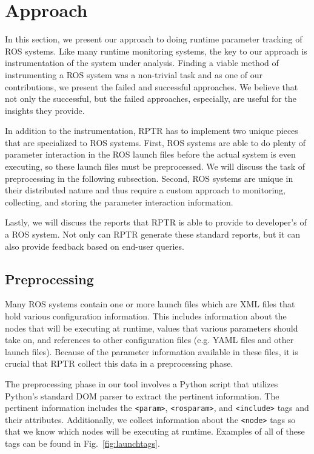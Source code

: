 \section{Approach}

In this section, we present our approach to doing runtime parameter tracking of ROS systems. Like many runtime monitoring systems, the key to our approach is instrumentation of the system under analysis. Finding a viable method of instrumenting a ROS system was a non-trivial task and as one of our contributions, we present the failed and successful approaches. We believe that not only the successful, but the failed approaches, especially, are useful for the insights they provide.

In addition to the instrumentation, RPTR has to implement two unique pieces that are specialized to ROS systems. First, ROS systems are able to do plenty of parameter interaction in the ROS launch files before the actual system is even executing, so these launch files must be preprocessed. We will discuss the task of preprocessing in the following subsection. Second, ROS systems are unique in their distributed nature and thus require a custom approach to monitoring, collecting, and storing the parameter interaction information.

Lastly, we will discuss the reports that RPTR is able to provide to developer's of a ROS system. Not only can RPTR generate these standard reports, but it can also provide feedback based on end-user queries.


\subsection{Preprocessing}

Many ROS systems contain one or more launch files which are XML files that hold various configuration information. This includes information about the nodes that will be executing at runtime, values that various parameters should take on, and references to other configuration files (e.g. YAML files and other launch files). Because of the parameter information available in these files, it is crucial that RPTR collect this data in a preprocessing phase.

The preprocessing phase in our tool involves a Python script that utilizes Python's standard DOM parser to extract the pertinent information. The pertinent information includes the \texttt{<param>}, \texttt{<rosparam>}, and \texttt{<include>} tags and their attributes. Additionally, we collect information about the \texttt{<node>} tags so that we know which nodes will be executing at runtime. Examples of all of these tags can be found in Fig.~\ref{fig:launchtags}.

